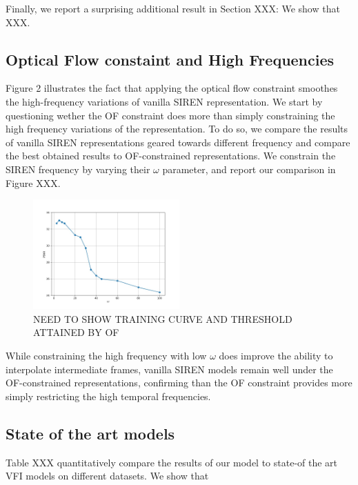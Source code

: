 \documentclass{article}
\begin{document}
Finally, we report a surprising additional result in Section XXX:
We show that XXX.

\subsection{Optical Flow constaint and High Frequencies}

Figure 2 illustrates the fact that applying the optical flow constraint smoothes the high-frequency variations of vanilla SIREN representation.
We start by questioning wether the OF constraint does more than simply constraining the high frequency variations of the representation.
To do so, we compare the results of vanilla SIREN representations geared towards different frequency and compare the
best obtained results to OF-constrained representations.
We constrain the SIREN frequency by varying their $\omega$ parameter, and report our comparison in Figure XXX.

\begin{figure}[t]
\centering
\includegraphics[width=0.5\textwidth]{"omega_wo_of"}
\caption{NEED TO SHOW TRAINING CURVE AND THRESHOLD ATTAINED BY OF}
\end{figure}

While constraining the high frequency with low $\omega$ does improve the ability to interpolate intermediate frames,
vanilla SIREN models remain well under the OF-constrained representations,
confirming than the OF constraint provides more simply restricting the high temporal frequencies.

\subsection{State of the art models}

Table XXX quantitatively compare the results of our model to state-of the art VFI models on different datasets.
We show that
\end{document}
